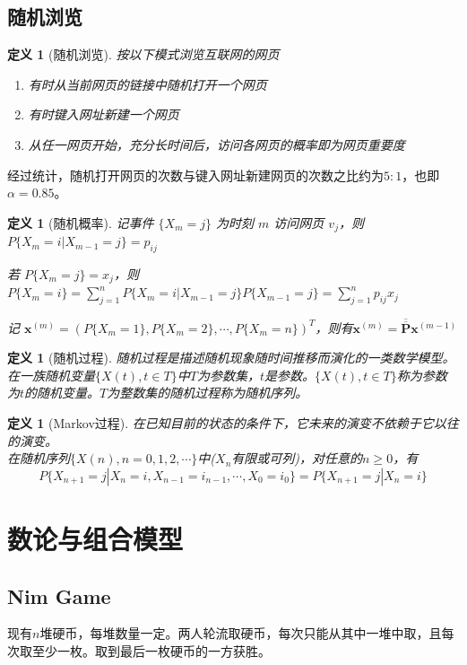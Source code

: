 \documentclass[12pt, a4paper, oneside]{ctexbook}
\newtheorem{definition}[theorem]{定义}
\begin{document}
\section{随机浏览}
\begin{definition}[随机浏览]
    按以下模式浏览互联网的网页
\begin{enumerate}
    \item 有时从当前网页的链接中随机打开一个网页
    \item 有时键入网址新建一个网页
    \item 从任一网页开始，充分长时间后，访问各网页的概率即为网页重要度
\end{enumerate}
\end{definition}
经过统计，随机打开网页的次数与键入网址新建网页的次数之比约为$5:1$，也即$\alpha=0.85$。

\begin{definition}[随机概率]
记事件 $\{X_m=j\}$ 为时刻 $m$ 访问网页 $v_j$，则$P\{X_m=i | X_{m-1}=j\}=p_{ij}$

若  $P\{X_m=j\}=x_j$，则$P\{X_{m}=i\}=\sum\limits_{j=1}^nP\{X_m=i | X_{m-1}=j\}P\{X_{m-1}=j\}=\sum\limits_{j=1}^np_{ij}x_j$

记 $\mathbf{x}^{(m)}=(P\{X_m=1\},P\{X_m=2\},\cdots,P\{X_m=n\})^T$，则有$\mathbf{x}^{(m)}=\overline{\overline{\mathbf{P}}}\mathbf{x}^{(m-1)}$
\end{definition}
\begin{definition}[随机过程]
随机过程是描述随机现象随时间推移而演化的一类数学模型。\\
在一族随机变量$\{X(t),t\in T\}$中$T$为参数集，$t$是参数。$\{X(t),t\in T\}$称为参数为$t$的随机变量。$T$为整数集的随机过程称为随机序列。
\end{definition}
\begin{definition}[Markov过程]
在已知目前的状态的条件下，它未来的演变不依赖于它以往的演变。\\
在随机序列$\{X(n),n=0,1,2,\cdots\}$中($X_n$有限或可列)，对任意的$n\geq0$，有
$$P\{X_{n+1}=j | X_n=i,X_{n-1}=i_{n-1},\cdots,X_0=i_0\}=P\{X_{n+1}=j | X_n=i\}$$
\end{definition}
\newpage
\chapter{数论与组合模型}
\section{Nim Game}
现有$n$堆硬币，每堆数量一定。两人轮流取硬币，每次只能从其中一堆中取，且每次取至少一枚。取到最后一枚硬币的一方获胜。 
\end{document}
